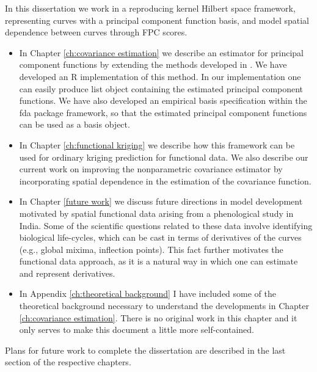 In this dissertation we work in a reproducing kernel Hilbert space framework, representing curves with a principal component function basis, and model spatial dependence between curves through FPC scores.  
\begin{itemize}
\item In Chapter \ref{ch:covariance estimation} we describe an estimator for principal component functions by extending the methods developed in \cite{Cai:2010vr}. We have developed an R implementation of this method. In our implementation one can easily produce list object containing the estimated principal component functions. We have also developed an empirical basis specification  within the fda package framework, so that the estimated principal component functions can be used as a basis object.  %
\item In Chapter \ref{ch:functional kriging} we describe how this framework can be used for ordinary kriging prediction for functional data. We also describe our current work on improving the nonparametric covariance estimator by incorporating spatial dependence in the estimation of the covariance function. 
\item  In Chapter \ref{future work} we discuss future directions in model development motivated by spatial functional data arising from a phenological study in India. Some of the scientific questions related to these data involve identifying biological life-cycles, which can be cast in terms of derivatives of the curves (e.g., global mixima, inflection points). This fact further motivates the functional data approach, as it is a natural way in which one can estimate and represent derivatives. 
\item In Appendix \ref{ch:theoretical background} I have included some of the theoretical background necessary to understand the developments in Chapter \ref{ch:covariance estimation}. There is no original work in this chapter and it only serves to make this document a little more self-contained. 
\end{itemize}

Plans for future work to complete the dissertation are described in the last section of the respective chapters. 


